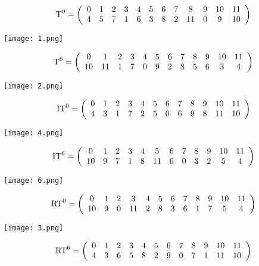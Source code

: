 	
	\[\mbox{T}^0=\left(\begin{array}{*{12}c}0&1&2&3&4&5&6&7&8&9&10&11\\4&5&7&1&6&3&8&2&11&0&9&10\\\end{array}\right)\]
	\begin{center}
		\texttt{[image: 1.png]}
	\end{center}
	\bigskip\bigskip
	\[\mbox{T}^6=\left(\begin{array}{*{12}c}0&1&2&3&4&5&6&7&8&9&10&11\\10&11&1&7&0&9&2&8&5&6&3&4\\\end{array}\right)\]
	\begin{center}
		\texttt{[image: 2.png]}
	\end{center}
	\bigskip\bigskip
	\[\mbox{IT}^0=\left(\begin{array}{*{12}c}0&1&2&3&4&5&6&7&8&9&10&11\\4&3&1&7&2&5&0&6&9&8&11&10\\\end{array}\right)\]
	\begin{center}
		\texttt{[image: 4.png]}
	\end{center}
	\bigskip\bigskip
	\[\mbox{IT}^6=\left(\begin{array}{*{12}c}0&1&2&3&4&5&6&7&8&9&10&11\\10&9&7&1&8&11&6&0&3&2&5&4\\\end{array}\right)\]
	\begin{center}
		\texttt{[image: 6.png]}
	\end{center}
\bigskip\bigskip
	\[\mbox{RT}^0=\left(\begin{array}{*{12}c}0&1&2&3&4&5&6&7&8&9&10&11\\10&9&0&11&2&8&3&6&1&7&5&4\\\end{array}\right)\]
	\begin{center}
		\texttt{[image: 3.png]}
	\end{center}
	\bigskip\bigskip
	\[\mbox{RT}^6=\left(\begin{array}{*{12}c}0&1&2&3&4&5&6&7&8&9&10&11\\4&3&6&5&8&2&9&0&7&1&11&10\\\end{array}\right)\]
